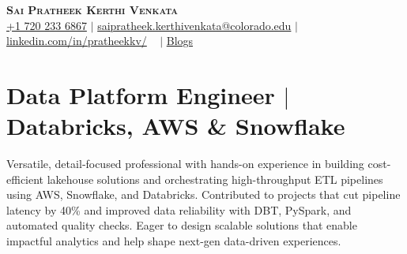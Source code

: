 \documentclass[letterpaper,10pt]{article}
\begin{document}

\begin{center}
    \textbf{\Large \scshape Sai Pratheek Kerthi Venkata} \\ \vspace{3pt}
    \small
    \faMobile \hspace{.5pt} \href{tel:+17202336867}{+1 720 233 6867}
    $|$
    \faAt \hspace{.5pt} \href{mailto:saipratheek.kerthivenkata@colorado.edu}{saipratheek.kerthivenkata@colorado.edu}
    $|$
    \faLinkedinSquare \hspace{.5pt} \href{https://www.linkedin.com/in/pratheekkv/}{linkedin.com/in/pratheekkv/}
    \
    $|$
    \faRssSquare \hspace{.5pt}
    \href{https://www.cloudthat.com/resources/author/sai-pratheek/}{Blogs}
\end{center}
\vspace{-15pt}


\section{Data Platform Engineer $|$ \small{Databricks, AWS \& Snowflake}}

Versatile, detail‑focused professional with hands-on experience in building cost-efficient lakehouse solutions and orchestrating high-throughput ETL pipelines using AWS, Snowflake, and Databricks. Contributed to projects that cut pipeline latency by 40\% and improved data reliability with DBT, PySpark, and automated quality checks. Eager to design scalable solutions that enable impactful analytics and help shape next-gen data-driven experiences.

\vspace{-10pt}
\fontsize{9}{10}\selectfont
\end{document}
